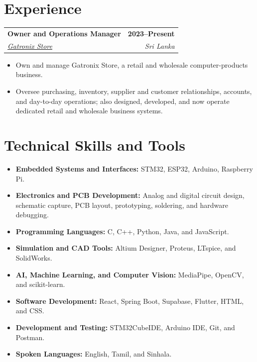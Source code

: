 \documentclass[a4paper,10pt]{article}
\makeatletter
\newcommand{\educationEntry}[4]{%
  \begin{tabularx}{\textwidth}{@{}Xr@{}}
    \textbf{#1} & \textbf{\small #2} \\
    \textit{#3} & \textit{\small #4}
  \end{tabularx}
}
\makeatother
\begin{document}
\vspace{1.1mm}

\section{Experience}

\educationEntry
  {Owner and Operations Manager}
  {2023--Present}
  {\href{https://maps.app.goo.gl/z9wBnqUMZs5da7UM9}{Gatronix Store \faMapMarker}}
  {Sri Lanka}

\begin{itemize}
  \item Own and manage Gatronix Store, a retail and wholesale computer-products business.
  \item Oversee purchasing, inventory, supplier and customer relationships, accounts, and day-to-day operations; also designed, developed, and now operate dedicated retail and wholesale business systems.
\end{itemize}

\section{Technical Skills and Tools}
\begin{itemize}[itemsep=0.8mm,topsep=0.45mm]
  \item \textbf{Embedded Systems and Interfaces:} STM32, ESP32, Arduino, Raspberry Pi.
  \item \textbf{Electronics and PCB Development:} Analog and digital circuit design, schematic capture, PCB layout, prototyping, soldering, and hardware debugging.
  \item \textbf{Programming Languages:} C, C++, Python, Java, and JavaScript.
  \item \textbf{Simulation and CAD Tools:} Altium Designer,  Proteus, LTspice, and SolidWorks.
  \item \textbf{AI, Machine Learning, and Computer Vision:} MediaPipe, OpenCV, and scikit-learn.
  \item \textbf{Software Development:} React, Spring Boot, Supabase, Flutter, HTML, and CSS.
  \item \textbf{Development and Testing:} STM32CubeIDE, Arduino IDE, Git, and Postman.
  \item \textbf{Spoken Languages:} English, Tamil, and Sinhala.
\end{itemize}
\end{document}
